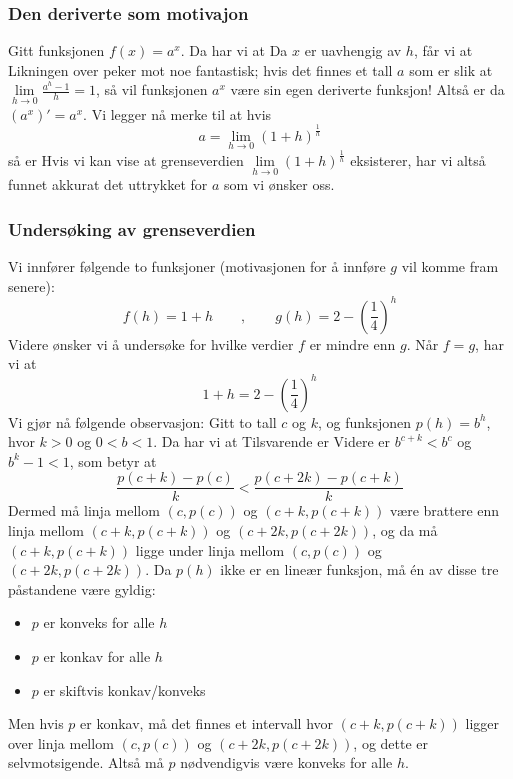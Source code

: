 



	
 \label{eulerstallfork}
\subsubsection{Den deriverte som motivajon}
Gitt funksjonen $ f(x)=a^x $. Da har vi at
Da $ x $ er uavhengig av $ h $, får vi at
Likningen over peker mot noe fantastisk; hvis det finnes et tall $ a $ som er slik at $ {\lim\limits_{h\to 0}\frac{a^h-1}{h}=1} $, så vil funksjonen $ a^x $ være sin egen deriverte funksjon! Altså er da $ \left(a^x\right)'=a^x $. Vi legger nå merke til at hvis
\[ a=\lim\limits_{h\to 0}\left(1+h\right)^\frac{1}{h} \]
så er 
Hvis vi kan vise at grenseverdien $ \lim\limits_{h\to 0}\left(1+h\right)^\frac{1}{h} $ eksisterer, har vi altså funnet akkurat det uttrykket for $ a $ som vi ønsker oss.

\subsubsection{Undersøking av grenseverdien}
Vi innfører følgende to funksjoner (motivasjonen for å innføre $ g $ vil komme fram senere):
\[ f(h)=1+h \qquad,\qquad g(h)=2-\left(\frac{1}{4}\right)^{h}\]
Videre ønsker vi å undersøke for hvilke verdier $ f $ er mindre enn  $ g $. Når $ f=g $, har vi at
\begin{equation}\label{eforkleqh}
	1+h=2-\left(\frac{1}{4}\right)^h 
\end{equation}
Vi gjør nå følgende observasjon: Gitt to tall $ c $ og $ k $, og funksjonen $ p(h)=b^h $, hvor $ k>0 $ og $ 0<b<1 $. Da har vi at
Tilsvarende er
Videre er $ b^{c+k}<b^c $ og $ b^k-1<1 $, som betyr at
\[ \frac{p(c+k)-p(c)}{k}<\frac{p(c+2k)-p(c+k)}{k} \]
Dermed må linja mellom $ (c, p(c)) $ og $ (c+k, p(c+k)) $ være brattere enn linja mellom $ (c+k, p(c+k)) $ og $ (c+2k, p(c+2k)) $, og da må $ (c+k, p(c+k)) $ ligge under linja mellom $ (c, p(c)) $ og $ (c+2k, p(c+2k)) $.
Da $ p(h) $ ikke er en lineær funksjon, må én av disse tre påstandene være gyldig:
\begin{itemize}
	\item $ p $ er konveks for alle $ h$
	\item $ p $ er konkav for alle $ h $
	\item $ p $ er skiftvis konkav/konveks
\end{itemize}
Men hvis $ p $ er konkav, må det finnes et intervall hvor $ (c+k, p(c+k)) $ ligger over linja mellom $ (c, p(c)) $ og $ (c+2k, p(c+2k)) $, og dette er selvmotsigende. Altså må $ p $ nødvendigvis være konveks for alle $ h $.\vsk

